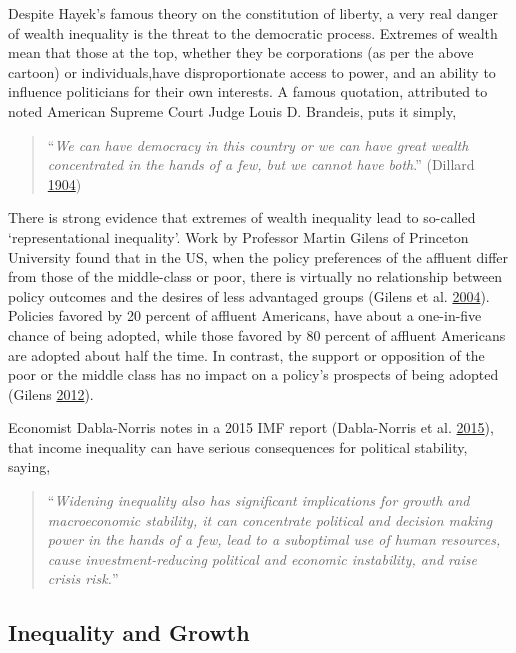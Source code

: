\documentclass[]{tufte-handout}
\begin{document}
Despite Hayek's famous theory on the constitution of liberty, a very
real danger of wealth inequality is the threat to the democratic
process. Extremes of wealth mean that those at the top, whether they be
corporations (as per the above cartoon) or individuals,have
disproportionate access to power, and an ability to influence
politicians for their own interests. A famous quotation, attributed to
noted American Supreme Court Judge Louis D. Brandeis, puts it simply,

\begin{quote}
``\emph{We can have democracy in this country or we can have great
wealth concentrated in the hands of a few, but we cannot have both}.''
(Dillard \protect\hyperlink{ref-Dillard1904}{1904})
\end{quote}

There is strong evidence that extremes of wealth inequality lead to
so-called `representational inequality'. Work by Professor Martin Gilens
of Princeton University found that in the US, when the policy
preferences of the affluent differ from those of the middle-class or
poor, there is virtually no relationship between policy outcomes and the
desires of less advantaged groups (Gilens et al.
\protect\hyperlink{ref-Gilens2004}{2004}). Policies favored by 20
percent of affluent Americans, have about a one-in-five chance of being
adopted, while those favored by 80 percent of affluent Americans are
adopted about half the time. In contrast, the support or opposition of
the poor or the middle class has no impact on a policy's prospects of
being adopted (Gilens \protect\hyperlink{ref-Gilens2012}{2012}).

Economist Dabla-Norris notes in a 2015 IMF report (Dabla-Norris et al.
\protect\hyperlink{ref-Dabla-Norris2015}{2015}), that income inequality
can have serious consequences for political stability, saying,

\begin{quote}
``\emph{Widening inequality also has significant implications for growth
and macroeconomic stability, it can concentrate political and decision
making power in the hands of a few, lead to a suboptimal use of human
resources, cause investment-reducing political and economic instability,
and raise crisis risk.}''
\end{quote}

\hypertarget{inequality-and-growth}{%
\subsection{Inequality and Growth}\label{inequality-and-growth}}
\end{document}

